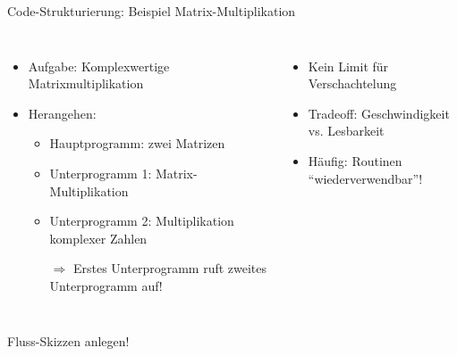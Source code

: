 \begin{frame}[t]{Code-Strukturierung: Beispiel Matrix-Multiplikation}
%
\begin{columns}[T]
\begin{itemize}
\item Aufgabe: Komplexwertige Matrixmultiplikation
\item Herangehen:
	\begin{itemize}
	\item Hauptprogramm: zwei Matrizen
	\item Unterprogramm 1: Matrix-Multiplikation
	\item Unterprogramm 2: Multiplikation komplexer Zahlen
	\item[$\Rightarrow$] Erstes Unterprogramm ruft zweites Unterprogramm auf!
	\end{itemize}
\end{itemize}
%
\begin{itemize}
\item Kein Limit für Verschachtelung
\item Tradeoff: Geschwindigkeit vs. Lesbarkeit
\item Häufig: Routinen \enquote{wiederverwendbar}!
\end{itemize}
%
\vspace{10pt}
\begin{adjustbox}{max totalsize={.9\textwidth}{.7\textheight},center}
\end{adjustbox}
%
\end{columns}
%
\begin{hintbox}
Fluss-Skizzen anlegen!
\end{hintbox}
%
\end{frame}